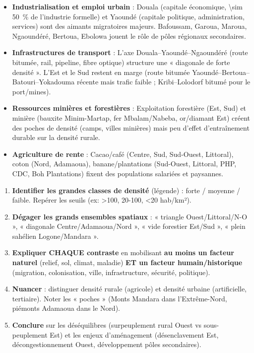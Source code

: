 \documentclass[11pt]{article}
\newcommand{\cle}[1]{{\popxbold\color{popdark}#1}}
\begin{document}
\begin{itemize}
\item \textbf{Industrialisation et emploi urbain} : Douala (capitale économique, \SI{\sim 50}{\%} de l'industrie formelle) et Yaoundé (capitale politique, administration, services) sont des \cle{aimants migratoires} majeurs. Bafoussam, Garoua, Maroua, Ngaoundéré, Bertoua, Ebolowa jouent le rôle de pôles régionaux secondaires.
\item \textbf{Infrastructures de transport} : L'axe \cle{Douala--Yaoundé--Ngaoundéré} (route bitumée, rail, pipeline, fibre optique) structure une « diagonale de forte densité ». L'Est et le Sud restent en marge (route bitumée Yaoundé--Bertoua--Batouri--Yokadouma récente mais trafic faible ; Kribi--Lolodorf bitumé pour le port/mines).
\item \textbf{Ressources minières et forestières} : Exploitation forestière (Est, Sud) et minière (bauxite Minim-Martap, fer Mbalam/Nabeba, or/diamant Est) créent des poches de densité (camps, villes minières) mais peu d'effet d'entraînement durable sur la densité rurale.
\item \textbf{Agriculture de rente} : Cacao/café (Centre, Sud, Sud-Ouest, Littoral), coton (Nord, Adamaoua), banane/plantations (Sud-Ouest, Littoral, PHP, CDC, Boh Plantations) fixent des populations salariées et paysannes.
\end{itemize}

\begin{methode}
\begin{enumerate}
\item \textbf{Identifier les grandes classes de densité} (légende) : forte / moyenne / faible. Repérer les seuils (ex: >100, 20-100, <20 hab/km²).
\item \textbf{Dégager les grands ensembles spatiaux} : « triangle Ouest/Littoral/N-O », « diagonale Centre/Adamaoua/Nord », « vide forestier Est/Sud », « plein sahélien Logone/Mandara ».
\item \textbf{Expliquer CHAQUE contraste} en mobilisant \textbf{au moins un facteur naturel} (relief, sol, climat, maladie) \textbf{ET un facteur humain/historique} (migration, colonisation, ville, infrastructure, sécurité, politique).
\item \textbf{Nuancer} : distinguer densité rurale (agricole) et densité urbaine (artificielle, tertiaire). Noter les « poches » (Monts Mandara dans l'Extrême-Nord, piémonts Adamaoua dans le Nord).
\item \textbf{Conclure} sur les déséquilibres (surpeuplement rural Ouest vs sous-peuplement Est) et les enjeux d'aménagement (désenclavement Est, décongestionnement Ouest, développement pôles secondaires).
\end{enumerate}
\end{methode}
\end{document}
